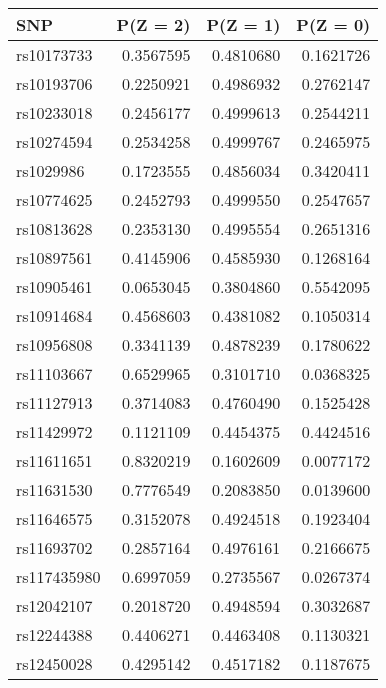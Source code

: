 \documentclass[
]{article}
\theoremstyle{plain}
\begin{document}
\begin{table}[H]
  \caption{Table of the marginal distribution of instruments, $P(Z = z), z=0,1,2$, estimated after preprocessing for analysis in Section    \ref{smoking-effect-on-depression}}
  \label{tab:marginal-distribution-of-instruments-depression}
  \begin{minipage}{0.5\linewidth}
    \center
    \begin{table}[H]
\centering
\begin{tabular}{lrrr}
\toprule
SNP & P(Z = 2) & P(Z = 1) & P(Z = 0)\\
\midrule
rs10173733 & 0.3567595 & 0.4810680 & 0.1621726\\
rs10193706 & 0.2250921 & 0.4986932 & 0.2762147\\
rs10233018 & 0.2456177 & 0.4999613 & 0.2544211\\
rs10274594 & 0.2534258 & 0.4999767 & 0.2465975\\
rs1029986 & 0.1723555 & 0.4856034 & 0.3420411\\
\addlinespace
rs10774625 & 0.2452793 & 0.4999550 & 0.2547657\\
rs10813628 & 0.2353130 & 0.4995554 & 0.2651316\\
rs10897561 & 0.4145906 & 0.4585930 & 0.1268164\\
rs10905461 & 0.0653045 & 0.3804860 & 0.5542095\\
rs10914684 & 0.4568603 & 0.4381082 & 0.1050314\\
\addlinespace
rs10956808 & 0.3341139 & 0.4878239 & 0.1780622\\
rs11103667 & 0.6529965 & 0.3101710 & 0.0368325\\
rs11127913 & 0.3714083 & 0.4760490 & 0.1525428\\
rs11429972 & 0.1121109 & 0.4454375 & 0.4424516\\
rs11611651 & 0.8320219 & 0.1602609 & 0.0077172\\
\addlinespace
rs11631530 & 0.7776549 & 0.2083850 & 0.0139600\\
rs11646575 & 0.3152078 & 0.4924518 & 0.1923404\\
rs11693702 & 0.2857164 & 0.4976161 & 0.2166675\\
rs117435980 & 0.6997059 & 0.2735567 & 0.0267374\\
rs12042107 & 0.2018720 & 0.4948594 & 0.3032687\\
\addlinespace
rs12244388 & 0.4406271 & 0.4463408 & 0.1130321\\
rs12450028 & 0.4295142 & 0.4517182 & 0.1187675\\

\end{tabular}
\end{table}
\end{minipage}
\end{table}
\end{document}
